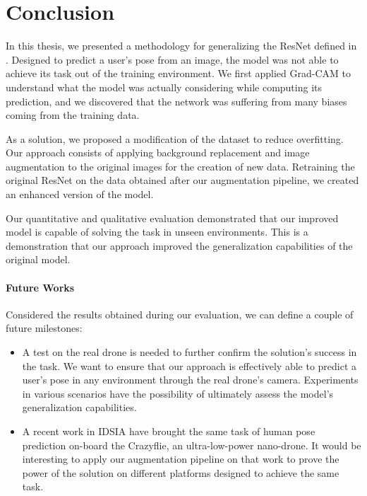 \chapter{Conclusion}
\label{chap:conclusion}
 
 
In this thesis, we presented a methodology for generalizing the ResNet defined in \cite{mantegazza2019visionbased}. Designed to predict a user's pose from an image, the model was not able to achieve its task out of the training environment. We first applied Grad-CAM to understand what the model was actually considering while computing its prediction, and we discovered that the network was suffering from many biases coming from the training data.

As a solution, we proposed a modification of the dataset to reduce overfitting. Our approach consists of applying background replacement and image augmentation to the original images for the creation of new data. Retraining the original ResNet on the data obtained after our augmentation pipeline, we created an enhanced version of the model.

Our quantitative and qualitative evaluation demonstrated that our improved model is capable of solving the task in unseen environments. This is a demonstration that our approach improved the generalization capabilities of the original model.





\subsubsection*{Future Works}
\label{subsec:future-works}

Considered the results obtained during our evaluation, we can define a couple of future milestones: 

\begin{itemize}
    \item A test on the real drone is needed to further confirm the solution's success in the task. We want to ensure that our approach is effectively able to predict a user's pose in any environment through the real drone's camera. Experiments in various scenarios have the possibility of ultimately assess the model's generalization capabilities. 
    \item A recent work in IDSIA \cite{zimmerman2020thesis} have brought the same task of human pose prediction on-board the Crazyflie, an ultra-low-power nano-drone. It would be interesting to apply our augmentation pipeline on that work to prove the power of the solution on different platforms designed to achieve the same task.
\end{itemize}
